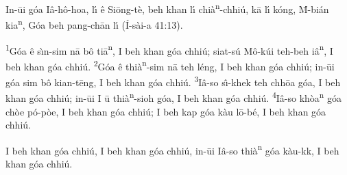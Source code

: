 \documentclass{article}
\newcommand*{\nn}{\textsuperscript{n}}
\newcommand*{\pehin}[1]{\stackinset{c}{}{b}{5.5pt}{\small\ttfamily\char'15}{#1}}
\newcommand*{\pehinbf}[1]{\stackinset{c}{}{b}{5.5pt}{\ttfamily\char'15}{#1}}
\newcommand*{\dtr}{\raisebox{3.5pt}{$\scalebox{.3}{$\bullet$}$}}
\newcommand*{\dtrbf}{\raisebox{3.5pt}{$\scalebox{.5}{$\bullet$}$}}
\begin{document}
{\rmfamily
\par
In-\={u}i g\'{o}a I\^{a}-h\^{o}-hoa, l\'{\i} \^{e} Si\={o}ng-t\`{e}, beh khan l\'{\i} chi\`{a}{\nn}-chhi\'{u}, k\={a} l\'{\i} k\'{o}ng, \={M}-bi\'{a}n kia{\nn}, G\'{o}a beh pang-ch\={a}n l\'{\i} (\'{I}-s\`{a}i-a 41:13).\\
\par
\textsuperscript{1}G\'{o}a \^{e} s\`{\i}n-sim n\={a} b\^{o} ti\={a}{\nn}, I beh khan g\'{o}a chhi\'{u}; siat-s\'{u} M\^{o}{\dtr}-k\'{u}i teh-beh i\^{a}{\nn}, I beh khan g\'{o}a chhi\'{u}. 
\textsuperscript{2}G\'{o}a \^{e} thi\`{a}{\nn}-sim n\={a} teh l\'{e}ng, I beh khan g\'{o}a chhi\'{u}; in-\={u}i g\'{o}a sim b\^{o} kian-t\={e}ng, I beh khan g\'{o}a chhi\'{u}. 
\textsuperscript{3}I\^{a}-so{\dtr} s\^{\i}-khek teh chh\={o}a g\'{o}a, I beh khan g\'{o}a chhi\'{u}; in-\={u}i I \={u} thi\`{a}{\nn}-sioh g\'{o}a, I beh khan g\'{o}a chhi\'{u}. 
\textsuperscript{4}I\^{a}-so{\dtr} kh\`{o}a{\nn} g\'{o}a ch\`{o}e p\'{o}-p\`{o}e, I beh khan g\'{o}a chhi\'{u}; I beh kap g\'{o}a k\`{a}u l\={o}{\dtr}-b\'{e},  I beh khan g\'{o}a chhi\'{u}.\newline
\par
I beh khan g\'{o}a chhi\'{u}, I beh khan g\'{o}a chhi\'{u}, in-\={u}i I\^{a}-so{\dtr} thi\`{a}{\nn} g\'{o}a k\`{a}u-k\pehin{e}k, I beh khan g\'{o}a chhi\'{u}.\\
}
\end{document}
